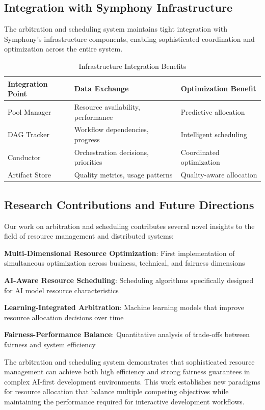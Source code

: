\subsection*{Integration with Symphony Infrastructure}

The arbitration and scheduling system maintains tight integration with Symphony's infrastructure components, enabling sophisticated coordination and optimization across the entire system.

\begin{table}[ht]
\centering
\begin{tabular}{@{}lll@{}}
\toprule
\textbf{Integration Point} & \textbf{Data Exchange} & \textbf{Optimization Benefit} \\
\midrule
Pool Manager & Resource availability, performance & Predictive allocation \\
DAG Tracker & Workflow dependencies, progress & Intelligent scheduling \\
Conductor & Orchestration decisions, priorities & Coordinated optimization \\
Artifact Store & Quality metrics, usage patterns & Quality-aware allocation \\
\bottomrule
\end{tabular}
\caption{Infrastructure Integration Benefits}
\end{table}

\subsection*{Research Contributions and Future Directions}

Our work on arbitration and scheduling contributes several novel insights to the field of resource management and distributed systems:

\begin{expandedlist}
    \item \textbf{Multi-Dimensional Resource Optimization}: First implementation of simultaneous optimization across business, technical, and fairness dimensions
    \item \textbf{AI-Aware Resource Scheduling}: Scheduling algorithms specifically designed for AI model resource characteristics
    \item \textbf{Learning-Integrated Arbitration}: Machine learning models that improve resource allocation decisions over time
    \item \textbf{Fairness-Performance Balance}: Quantitative analysis of trade-offs between fairness and system efficiency
\end{expandedlist}

The arbitration and scheduling system demonstrates that sophisticated resource management can achieve both high efficiency and strong fairness guarantees in complex AI-first development environments. This work establishes new paradigms for resource allocation that balance multiple competing objectives while maintaining the performance required for interactive development workflows.
